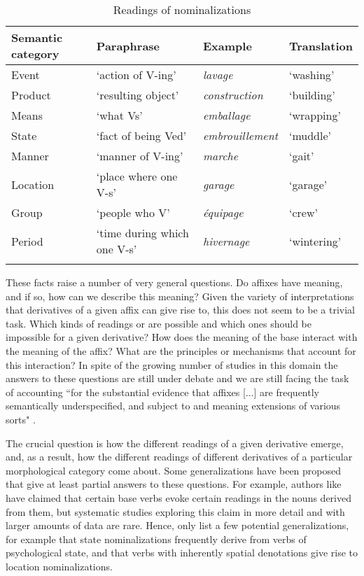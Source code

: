 \documentclass[output=paper]{langsci/langscibook}
\begin{document}
\begin{table}  
	 
\begin{tabularx}{\textwidth}{Xlll}
	\lsptoprule
	{Semantic category} & {Paraphrase} & {Example} & {Translation}\\
	\midrule
	Event & `action of V-ing'  & \textit{lavage}  & `washing'\\
	Product  & `resulting object'  & \textit{construction}  & `building'\\
	Means   & `what Vs'  & \textit{emballage}  & `wrapping'\\
	State  & `fact of being Ved' &  \textit{embrouillement}  &  `muddle'\\
	Manner & `manner of V-ing'  & \textit{marche}  & `gait'\\
	Location  & `place where one V-s'  &  \textit{garage} &  `garage'\\
	Group  &  `people who V'  & \textit{\'{e}quipage}  & `crew'\\
	Period  & `time during which one V-s'  & \textit{hivernage}  & `wintering'\\
	\lspbottomrule
\end{tabularx} 
\caption{Readings of  nominalizations \citep{Fradin.2012b}}
\label{tab:French}
\end{table}

These facts raise a number of very general questions. Do affixes have meaning, and if so, how can we describe this meaning? Given the variety of interpretations that derivatives of a given affix can give rise to, this does not seem to be a trivial task. Which kinds of readings or  are possible and which ones should be impossible for a given derivative? How does the meaning of the base interact with the meaning of the affix? What are the principles or mechanisms that account for this interaction? In spite of the growing number of studies in this domain the answers to these questions are still under debate and we are still facing the task of accounting ``for the substantial evidence that affixes [...] are frequently semantically underspecified, and subject to  and meaning extensions of various sorts" \citep[641]{Bauer.2013}.

The crucial question is how the different readings of a given derivative emerge, and, as a result, how the different readings of different derivatives of a particular morphological category come about. Some generalizations have been proposed that give at least partial answers to these questions. For example, authors like \citet[212]{Bauer.2013} have claimed that certain base verbs evoke certain readings in the nouns derived from them, but systematic studies exploring this claim in more detail and with larger amounts of data are rare. Hence, \citet[213]{Bauer.2013} only list a few potential generalizations, for example that state nominalizations frequently derive from verbs of psychological state, and that verbs with inherently spatial denotations give rise to location nominalizations.
\end{document}
